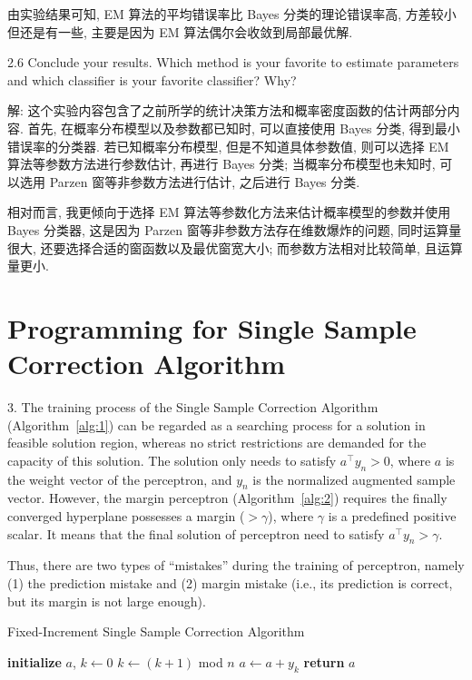 \documentclass{article}
\begin{document}
由实验结果可知, EM 算法的平均错误率比 Bayes 分类的理论错误率高, 方差较小但还是有一些, 主要是因为 EM 算法偶尔会收敛到局部最优解.

2.6 Conclude your results. Which method is your favorite to estimate parameters and which classifier is your favorite classifier? Why?

解: 这个实验内容包含了之前所学的统计决策方法和概率密度函数的估计两部分内容. 首先, 在概率分布模型以及参数都已知时, 可以直接使用 Bayes 分类, 得到最小错误率的分类器. 若已知概率分布模型, 但是不知道具体参数值, 则可以选择 EM 算法等参数方法进行参数估计, 再进行 Bayes 分类; 当概率分布模型也未知时, 可以选用 Parzen 窗等非参数方法进行估计, 之后进行 Bayes 分类.

相对而言, 我更倾向于选择 EM 算法等参数化方法来估计概率模型的参数并使用 Bayes 分类器, 这是因为 Parzen 窗等非参数方法存在维数爆炸的问题, 同时运算量很大, 还要选择合适的窗函数以及最优窗宽大小; 而参数方法相对比较简单, 且运算量更小.

\newpage
\section*{Programming for Single Sample Correction Algorithm}

3. The training process of the Single Sample Correction Algorithm (Algorithm~\ref{alg:1}) can be regarded as a searching process for a solution in feasible solution region, whereas no strict restrictions are demanded for the capacity of this solution. The solution only needs to satisfy $a^{\top}y_n>0$, where $a$ is the weight vector of the perceptron, and $y_n$ is the normalized augmented sample vector. However, the margin perceptron (Algorithm~\ref{alg:2}) requires the finally converged hyperplane possesses a margin ($>\gamma$), where $\gamma$ is a predefined positive scalar. It means that the final solution of perceptron need to satisfy $a^{\top}y_n>\gamma$.

Thus, there are two types of ``mistakes'' during the training of perceptron, namely (1) the prediction mistake and (2) margin mistake (i.e., its prediction is correct, but its margin is not large enough).

\begin{algorithm}[htb]
  \caption{Fixed-Increment Single Sample Correction Algorithm}
  \label{alg:1}
  \begin{algorithmic}[1]
  \STATE \textbf{initialize} $a$, $k\gets0$
  \REPEAT
    \STATE $k\gets(k+1)$ mod $n$
        \STATE $a\gets a+y_k$
    \ENDIF
  \STATE \textbf{return} $a$
  \end{algorithmic}
\end{algorithm}
\end{document}

